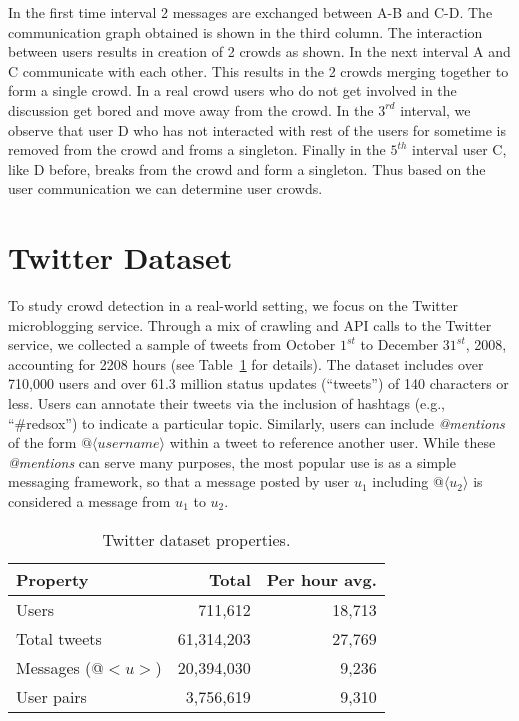 \documentclass{sig-alternate}
\begin{document}
In the first time interval 2 messages are exchanged between A-B and C-D. The
communication graph obtained is shown in the third column. The interaction
between users results in creation of 2 crowds as shown. In the next interval A
and C communicate with each other. This results in the 2 crowds merging
together to form a single crowd. In a real crowd users who do not get
involved in the discussion get bored and move away from the crowd. In the
$3^{rd}$ interval, we observe that user D who has not interacted with rest of
the users for sometime is removed from the crowd and froms a singleton. Finally in
the $5^{th}$ interval user C, like D before, breaks from the crowd and form a
singleton. Thus based on the user communication we can determine user crowds.


\section{Twitter Dataset}
To study crowd detection in a real-world setting, we focus on the Twitter
microblogging service. Through a mix of crawling and API calls to the Twitter
service, we collected a sample of tweets from October $1^{st}$ to December
$31^{st}$, 2008, accounting for 2208 hours (see Table~\ref{table:dataset} for
details). The dataset includes over 710,000 users and over 61.3 million status
updates (``tweets'') of 140 characters or less. Users can annotate their tweets
via the inclusion of hashtags (e.g., ``\#redsox'') to indicate a particular
topic. Similarly, users can include \textit{@mentions} of the form $@\langle
username \rangle$ within a tweet to reference another user. While these
\textit{@mentions} can serve many purposes, the most popular use is as a simple
messaging framework, so that a message posted by user $u_1$ including @$\langle
u_2 \rangle$ is considered a message from $u_1$ to $u_2$.

\begin{table}[h]
\centering
\label{table:dataset}
\begin{tabular}{|l|r|r|}
\hline
\textbf{Property} & \textbf{Total} & \textbf{Per hour avg.} \\ \hline
Users & 711,612 & 18,713 \\ \hline
Total tweets & 61,314,203 & 27,769 \\ \hline
Messages (@$<u>$) & 20,394,030 & 9,236\\ \hline
User pairs & 3,756,619 & 9,310\\ \hline
\end{tabular}
\caption{Twitter dataset properties.}
\end{table}
\end{document}
